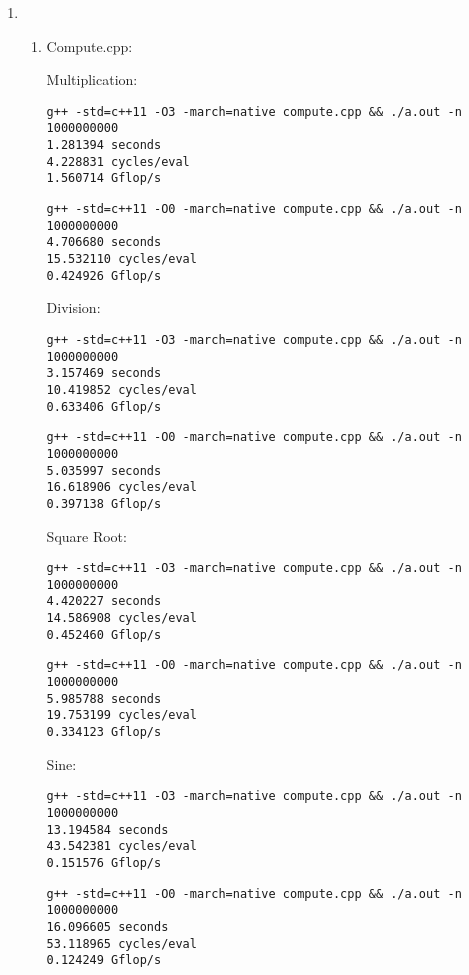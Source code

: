 \documentclass{article}
\begin{document}
\begin{enumerate}
    \item
    \begin{enumerate}
        \item Compute.cpp:

        Multiplication:
        \begin{verbatim}
g++ -std=c++11 -O3 -march=native compute.cpp && ./a.out -n 1000000000
1.281394 seconds
4.228831 cycles/eval
1.560714 Gflop/s
        \end{verbatim}

        \begin{verbatim}
g++ -std=c++11 -O0 -march=native compute.cpp && ./a.out -n 1000000000
4.706680 seconds
15.532110 cycles/eval
0.424926 Gflop/s
        \end{verbatim}

        Division:
        \begin{verbatim}
g++ -std=c++11 -O3 -march=native compute.cpp && ./a.out -n 1000000000
3.157469 seconds
10.419852 cycles/eval
0.633406 Gflop/s
        \end{verbatim}

        \begin{verbatim}
g++ -std=c++11 -O0 -march=native compute.cpp && ./a.out -n 1000000000
5.035997 seconds
16.618906 cycles/eval
0.397138 Gflop/s
        \end{verbatim}

        Square Root:
        \begin{verbatim}
g++ -std=c++11 -O3 -march=native compute.cpp && ./a.out -n 1000000000
4.420227 seconds
14.586908 cycles/eval
0.452460 Gflop/s
        \end{verbatim}

        \begin{verbatim}
g++ -std=c++11 -O0 -march=native compute.cpp && ./a.out -n 1000000000
5.985788 seconds
19.753199 cycles/eval
0.334123 Gflop/s
        \end{verbatim}

        Sine:
        \begin{verbatim}
g++ -std=c++11 -O3 -march=native compute.cpp && ./a.out -n 1000000000
13.194584 seconds
43.542381 cycles/eval
0.151576 Gflop/s
        \end{verbatim}

        \begin{verbatim}
g++ -std=c++11 -O0 -march=native compute.cpp && ./a.out -n 1000000000
16.096605 seconds
53.118965 cycles/eval
0.124249 Gflop/s
        \end{verbatim}


\end{enumerate}
\end{enumerate}
\end{document}

